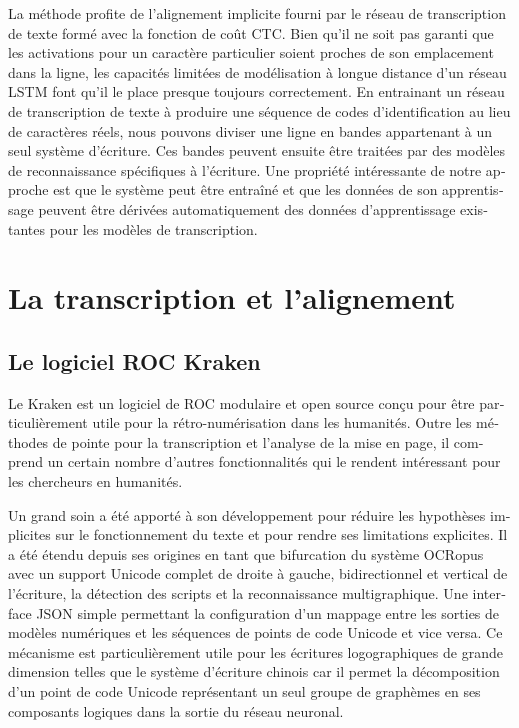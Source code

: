 \begin{french}
La méthode profite de l'alignement implicite fourni par le réseau de
transcription de texte formé avec la fonction de coût CTC.  Bien qu'il ne soit
pas garanti que les activations pour un caractère particulier soient proches de
son emplacement dans la ligne, les capacités limitées de modélisation à longue
distance d'un réseau LSTM font qu'il le place presque toujours correctement.
En entrainant un réseau de transcription de texte à produire une séquence de
codes d'identification au lieu de caractères réels, nous pouvons diviser une
ligne en bandes appartenant à un seul système d'écriture. Ces bandes peuvent
ensuite être traitées par des modèles de reconnaissance spécifiques à
l'écriture. Une propriété intéressante de notre approche est que le système
peut être entraîné et que les données de son apprentissage peuvent être
dérivées automatiquement des données d'apprentissage existantes pour les
modèles de transcription.

\section{La transcription et l'alignement}

\subsection{Le logiciel ROC Kraken}

Le Kraken est un logiciel de ROC modulaire et open source conçu pour être
particulièrement utile pour la rétro-numérisation dans les humanités.
Outre les méthodes de pointe pour la transcription et l'analyse de la mise en
page, il comprend un certain nombre d'autres fonctionnalités qui le rendent
intéressant pour les chercheurs en humanités.

Un grand soin a été apporté à son développement pour réduire les hypothèses
implicites sur le fonctionnement du texte et pour rendre ses limitations
explicites. Il a été étendu depuis ses origines en tant que bifurcation du
système OCRopus avec un support Unicode complet de droite à gauche,
bidirectionnel et vertical de l'écriture, la détection des scripts et la
reconnaissance multigraphique. Une interface JSON simple permettant la
configuration d'un mappage entre les sorties de modèles numériques et les
séquences de points de code Unicode et vice versa. Ce mécanisme est
particulièrement utile pour les écritures logographiques de grande dimension
telles que le système d'écriture chinois car il permet la décomposition d'un
point de code Unicode représentant un seul groupe de graphèmes en ses
composants logiques dans la sortie du réseau neuronal.


\end{french}
